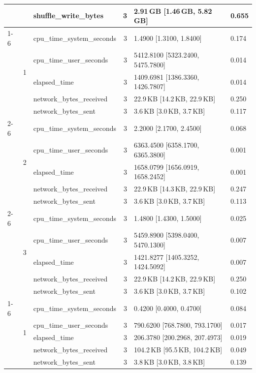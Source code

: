 \begin{tabular}{lllrll}
 &  & shuffle_write_bytes & 3 & 2.91\,GB [1.46\,GB, 5.82\,GB] & 0.655 \\
\cline{1-6} \cline{2-6}
\multirow[t]{15}{*}{national-scale-spatial-join-duckdb-medium} & \multirow[t]{5}{*}{1} & cpu_time_system_seconds & 3 & 1.4900 [1.3100, 1.8400] & 0.174 \\
 &  & cpu_time_user_seconds & 3 & 5412.8100 [5323.2400, 5475.7800] & 0.014 \\
 &  & elapsed_time & 3 & 1409.6981 [1386.3360, 1426.7807] & 0.014 \\
 &  & network_bytes_received & 3 & 22.9\,KB [14.2\,KB, 22.9\,KB] & 0.250 \\
 &  & network_bytes_sent & 3 & 3.6\,KB [3.0\,KB, 3.7\,KB] & 0.117 \\
\cline{2-6}
 & \multirow[t]{5}{*}{2} & cpu_time_system_seconds & 3 & 2.2000 [2.1700, 2.4500] & 0.068 \\
 &  & cpu_time_user_seconds & 3 & 6363.4500 [6358.1700, 6365.3800] & 0.001 \\
 &  & elapsed_time & 3 & 1658.0799 [1656.0919, 1658.2452] & 0.001 \\
 &  & network_bytes_received & 3 & 22.9\,KB [14.3\,KB, 22.9\,KB] & 0.247 \\
 &  & network_bytes_sent & 3 & 3.6\,KB [3.0\,KB, 3.7\,KB] & 0.113 \\
\cline{2-6}
 & \multirow[t]{5}{*}{3} & cpu_time_system_seconds & 3 & 1.4800 [1.4300, 1.5000] & 0.025 \\
 &  & cpu_time_user_seconds & 3 & 5459.8900 [5398.0400, 5470.1300] & 0.007 \\
 &  & elapsed_time & 3 & 1421.8277 [1405.3252, 1424.5092] & 0.007 \\
 &  & network_bytes_received & 3 & 22.9\,KB [14.2\,KB, 22.9\,KB] & 0.250 \\
 &  & network_bytes_sent & 3 & 3.6\,KB [3.0\,KB, 3.7\,KB] & 0.102 \\
\cline{1-6} \cline{2-6}
\multirow[t]{15}{*}{national-scale-spatial-join-duckdb-small} & \multirow[t]{5}{*}{1} & cpu_time_system_seconds & 3 & 0.4200 [0.4000, 0.4700] & 0.084 \\
 &  & cpu_time_user_seconds & 3 & 790.6200 [768.7800, 793.1700] & 0.017 \\
 &  & elapsed_time & 3 & 206.3780 [200.2968, 207.4973] & 0.019 \\
 &  & network_bytes_received & 3 & 104.2\,KB [95.5\,KB, 104.2\,KB] & 0.049 \\
 &  & network_bytes_sent & 3 & 3.8\,KB [3.0\,KB, 3.8\,KB] & 0.139 \\

\end{tabular}
